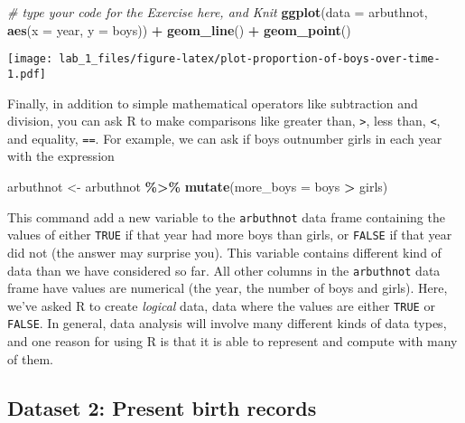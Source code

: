 \documentclass[
]{article}
\newenvironment{Shaded}{\begin{snugshade}}{\end{snugshade}}
\newcommand{\AttributeTok}[1]{\textcolor[rgb]{0.13,0.29,0.53}{#1}}
\newcommand{\CommentTok}[1]{\textcolor[rgb]{0.56,0.35,0.01}{\textit{#1}}}
\newcommand{\FunctionTok}[1]{\textcolor[rgb]{0.13,0.29,0.53}{\textbf{#1}}}
\newcommand{\NormalTok}[1]{#1}
\newcommand{\OtherTok}[1]{\textcolor[rgb]{0.56,0.35,0.01}{#1}}
\newcommand{\SpecialCharTok}[1]{\textcolor[rgb]{0.81,0.36,0.00}{\textbf{#1}}}
\begin{document}
\begin{Shaded}
\begin{Highlighting}[]
\CommentTok{\# type your code for the Exercise here, and Knit}
\FunctionTok{ggplot}\NormalTok{(}\AttributeTok{data =}\NormalTok{ arbuthnot, }\FunctionTok{aes}\NormalTok{(}\AttributeTok{x =}\NormalTok{ year, }\AttributeTok{y =}\NormalTok{ boys)) }\SpecialCharTok{+}
  \FunctionTok{geom\_line}\NormalTok{() }\SpecialCharTok{+}
  \FunctionTok{geom\_point}\NormalTok{()}
\end{Highlighting}
\end{Shaded}

\texttt{[image: lab\_1\_files/figure-latex/plot-proportion-of-boys-over-time-1.pdf]}

Finally, in addition to simple mathematical operators like subtraction
and division, you can ask R to make comparisons like greater than,
\texttt{\textgreater{}}, less than, \texttt{\textless{}}, and equality,
\texttt{==}. For example, we can ask if boys outnumber girls in each
year with the expression

\begin{Shaded}
\begin{Highlighting}[]
\NormalTok{arbuthnot }\OtherTok{\textless{}{-}}\NormalTok{ arbuthnot }\SpecialCharTok{\%\textgreater{}\%}
  \FunctionTok{mutate}\NormalTok{(}\AttributeTok{more\_boys =}\NormalTok{ boys }\SpecialCharTok{\textgreater{}}\NormalTok{ girls)}
\end{Highlighting}
\end{Shaded}

This command add a new variable to the \texttt{arbuthnot} data frame
containing the values of either \texttt{TRUE} if that year had more boys
than girls, or \texttt{FALSE} if that year did not (the answer may
surprise you). This variable contains different kind of data than we
have considered so far. All other columns in the \texttt{arbuthnot} data
frame have values are numerical (the year, the number of boys and
girls). Here, we've asked R to create \emph{logical} data, data where
the values are either \texttt{TRUE} or \texttt{FALSE}. In general, data
analysis will involve many different kinds of data types, and one reason
for using R is that it is able to represent and compute with many of
them.

\subsection{Dataset 2: Present birth
records}\label{dataset-2-present-birth-records}
\end{document}
